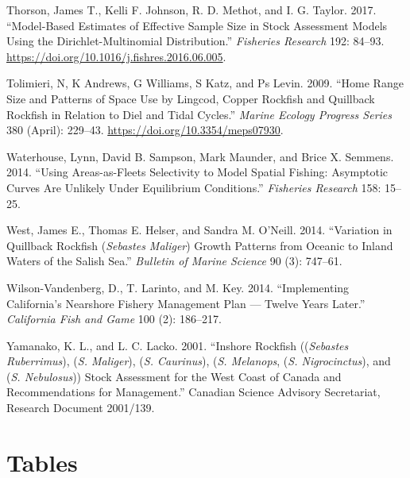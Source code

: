 \documentclass[11pt,
  english,
  a4paper,
]{article}
\begin{document}
\leavevmode\hypertarget{ref-thorson_model-based_2017}{}%
Thorson, James T., Kelli F. Johnson, R. D. Methot, and I. G. Taylor. 2017. ``Model-Based Estimates of Effective Sample Size in Stock Assessment Models Using the Dirichlet-Multinomial Distribution.'' \emph{Fisheries Research} 192: 84--93. \url{https://doi.org/10.1016/j.fishres.2016.06.005}.

\leavevmode\hypertarget{ref-tolimieri_home_2009}{}%
Tolimieri, N, K Andrews, G Williams, S Katz, and Ps Levin. 2009. ``Home Range Size and Patterns of Space Use by Lingcod, Copper Rockfish and Quillback Rockfish in Relation to Diel and Tidal Cycles.'' \emph{Marine Ecology Progress Series} 380 (April): 229--43. \url{https://doi.org/10.3354/meps07930}.

\leavevmode\hypertarget{ref-Waterhouseetal_spatialSelex_2014}{}%
Waterhouse, Lynn, David B. Sampson, Mark Maunder, and Brice X. Semmens. 2014. ``Using Areas-as-Fleets Selectivity to Model Spatial Fishing: Asymptotic Curves Are Unlikely Under Equilibrium Conditions.'' \emph{Fisheries Research} 158: 15--25.

\leavevmode\hypertarget{ref-Westetal_2014}{}%
West, James E., Thomas E. Helser, and Sandra M. O'Neill. 2014. ``Variation in Quillback Rockfish (\emph{Sebastes Maliger}) Growth Patterns from Oceanic to Inland Waters of the Salish Sea.'' \emph{Bulletin of Marine Science} 90 (3): 747--61.

\leavevmode\hypertarget{ref-Wilson-Vandenbergetal_2014}{}%
Wilson-Vandenberg, D., T. Larinto, and M. Key. 2014. ``Implementing California's Nearshore Fishery Management Plan --- Twelve Years Later.'' \emph{California Fish and Game} 100 (2): 186--217.

\leavevmode\hypertarget{ref-YamanakaandLacko_rockfish_2001}{}%
Yamanako, K. L., and L. C. Lacko. 2001. ``Inshore Rockfish ((\emph{Sebastes Ruberrimus}), (\emph{S. Maliger}), (\emph{S. Caurinus}), (\emph{S. Melanops}, (\emph{S. Nigrocinctus}), and (\emph{S. Nebulosus})) Stock Assessment for the West Coast of Canada and Recommendations for Management.'' Canadian Science Advisory Secretariat, Research Document 2001/139.

\leavevmode\tagmcend\tagstructend

\clearpage


\hypertarget{tables}{%
\section{Tables}\label{tables}}
\end{document}
